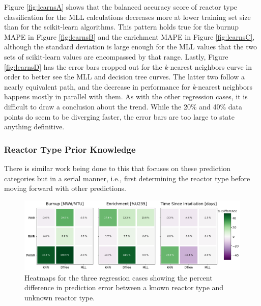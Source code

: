 Figure \ref{fig:learnsA} shows that the balanced accuracy score of reactor type
classification for the \gls{MLL} calculations decreases more at lower training
set size than for the scikit-learn algorithms.  This pattern holds true for the
burnup \gls{MAPE} in Figure \ref{fig:learnsB} and the enrichment \gls{MAPE} in
Figure \ref{fig:learnsC}, although the standard deviation is large enough for
the \gls{MLL} values that the two sets of scikit-learn values are encompassed
by that range. Lastly, Figure \ref{fig:learnsD} has the error bars cropped out
for the \textit{k}-nearest neighbors curve in order to better see the \gls{MLL}
and decision tree curves. The latter two follow a nearly equivalent path, and
the decrease in performance for \textit{k}-nearest neighbors happens mostly in
parallel with them. As with the other regression cases, it is difficult to draw
a conclusion about the trend. While the 20\% and 40\% data points do seem to be
diverging faster, the error bars are too large to state anything definitive.

\subsubsection{Reactor Type Prior Knowledge}

There is similar work being done  to this that focuses
on these prediction categories but in a serial manner, i.e., first determining
the reactor type before moving forward with other predictions.

\begin{figure}[!htb]
  \centering
  \includegraphics[width=1.1\textwidth]{./chapters/exp1/rxtr-type_known-unknown_diff.png}
  \caption{Heatmaps for the three regression cases showing the percent 
           difference in prediction error between a known reactor type 
           and unknown reactor type.}
  \label{fig:knownrxtr}
\end{figure}

